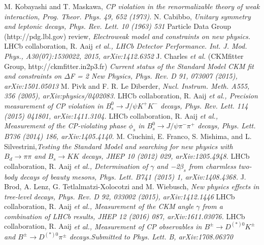 \documentclass[12pt]{article}
\begin{document}
\begin{thebibliography}{99}


 M. Kobayashi and T. Maskawa, \emph{CP violation in the renormalizable theory of weak interaction, Prog. Theor. Phys. 49, 652 (1973).}
 N. Cabibbo, \emph{Unitary symmetry and leptonic decays, Phys. Rev. Lett. 10 (1963) 531}
 Particle Data Group (http://pdg.lbl.gov) review, \emph{Electroweak model and constraints on new physics.}
 LHCb collaboration, R. Aaij \emph{et al., LHCb Detector Performance. Int. J. Mod. Phys., A30(07):1530022, 2015, arXiv:1412.6352}
 J. Charles \emph{et al.} (CKMfitter Group, http://ckmfitter.in2p3.fr) \emph{Current status of the Standard Model CKM fit and constraints on $\Delta$F = 2 New Physics, Phys. Rev. D 91, 073007 (2015), arXiv:1501.05013 }
 M. Pivk and F. R. Le Diberder, \emph{Nucl. Instrum. Meth. A555, 356 (2005), arXiv:physics/0402083.}
 LHCb collaboration, R. Aaij \emph{et al., Precision measurement of CP violation in $B_s^0 \rightarrow J/\psi K^+K^-$ decays, Phys. Rev. Lett. 114 (2015) 041801, arXiv:1411.3104.}
 LHCb collaboration, R. Aaij \emph{et al., Measurement of the CP-violating phase $\phi_s$ in $B^0_s \rightarrow J/\psi\pi^-\pi^+$ decays,  Phys. Lett. B736 (2014) 186, arXiv:1405.4140.}
 M. Ciuchini, E. Franco, S. Mishima, and L. Silvestrini,\emph{Testing the Standard Model and searching for new physics with $B_d \rightarrow \pi\pi$ and $B_s \rightarrow KK$ decays, JHEP 10 (2012) 029, arXiv:1205.4948.}
 LHCb collaboration, R. Aaij \emph{et al., Determination of $\gamma$ and −2$\beta_s$ from charmless two-body decays of beauty mesons, Phys. Lett. B741 (2015) 1, arXiv:1408.4368.}
 J. Brod, A. Lenz, G. Tetlalmatzi-Xolocotzi and M. Wiebusch, \emph{New physics effects in tree-level decays, Phys. Rev. D 92, 033002 (2015), arXiv:1412.1446}
 LHCb collaboration, R. Aaij \emph{et al., Measurement of the CKM angle $\gamma$ from a combination of LHCb results, JHEP 12 (2016) 087, arXiv:1611.03076.}
 LHCb collaboration, R. Aaij \emph{et al., Measurement of CP observables in $B^\pm \rightarrow D^{(*)0} K^\pm$ and $B^\pm \rightarrow D^{(*)0} \pi^\pm$ decays.Submitted to Phys. Lett. B, arXiv:1708.06370}

\end{thebibliography}
\end{document}
